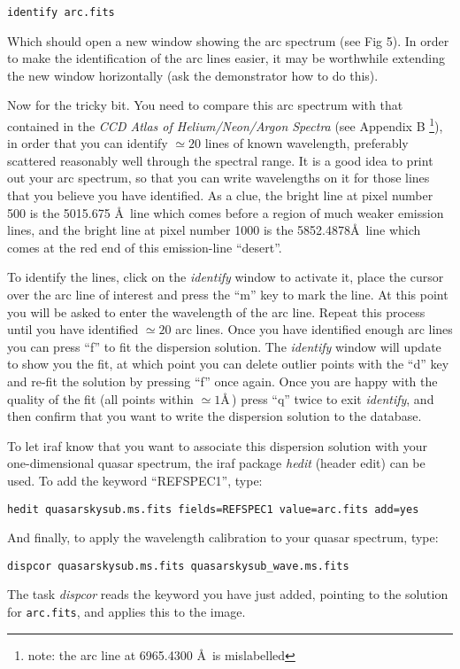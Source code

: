 {\tt identify arc.fits}

Which should open a new window showing the arc spectrum (see Fig 5). In order to make the identification of the arc lines easier, it may be worthwhile extending the new window horizontally (ask the demonstrator how to do this).

Now for the tricky bit. You need to compare this arc spectrum with that contained in the {\em CCD Atlas of Helium/Neon/Argon Spectra} (see Appendix B \footnote{note: the arc line at 6965.4300 \AA\ is mislabelled}), in order that you can identify $\simeq 20$ lines of known wavelength, preferably scattered reasonably well through the spectral range. It is a good idea to print out your arc spectrum, so that you can write wavelengths on it for those lines that you believe you have identified. As a clue, the bright line at pixel number 500 is the 5015.675 \AA\ line which comes before a region of much weaker emission lines, and the bright line at pixel number 1000 is the 5852.4878\AA\ line which comes at the red end of this emission-line ``desert''. 

To identify the lines, click on the {\it identify} window to activate it, place the cursor over the arc line of interest and press the ``m'' key to mark the line. At this point you will be asked to enter the wavelength of the arc line. Repeat this process until you have identified $\simeq20$ arc lines. Once you have identified enough arc lines you can press ``f'' to fit the dispersion solution. The {\it identify} window will update to show you the fit, at which point you can delete outlier points with the ``d'' key and re-fit the solution by pressing ``f'' once again. Once you are happy with the quality of the fit (all points within $\simeq1$\AA\,) press ``q'' twice to exit {\it identify}, and then confirm that you want to write the dispersion solution to the database.

To let {\sc iraf} know that you want to associate this dispersion solution with your one-dimensional quasar spectrum, the {\sc iraf} package {\it hedit} (header edit) can be used. To add the keyword ``REFSPEC1'', type:

{\tt hedit quasarskysub.ms.fits fields=REFSPEC1 value=arc.fits add=yes}

And finally, to apply the wavelength calibration to your quasar spectrum, type:

{\tt dispcor quasarskysub.ms.fits \verb,quasarskysub_wave.ms.fits,}

The task {\it dispcor} reads the keyword you have just added, pointing to the solution for {\tt arc.fits}, and applies this to the image.

